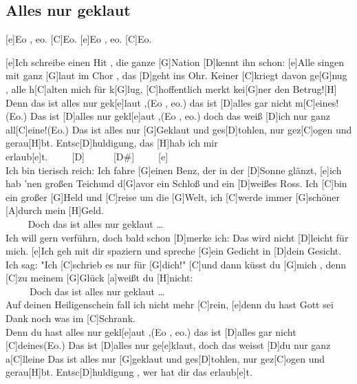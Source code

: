 \documentclass[10pt,a5paper,twoside, cleardoubleplain]{scrbook}
\begin{document}
\subsection{Alles nur geklaut}
\begin{guitar}

[e]Eo , eo. [C]Eo. [e]Eo , eo. [C]Eo.

[e]Ich schreibe einen Hit , die ganze [G]Nation [D]kennt ihn schon:
[e]Alle singen mit ganz [G]laut im Chor , das [D]geht ins Ohr.
Keiner [C]kriegt davon ge[G]nug , alle h[C]alten mich für k[G]lug,
[C]hoffentlich merkt kei[G]ner den Betrug![H]
\\
Denn das ist alles nur gek[e]laut ,(Eo , eo.) das ist [D]alles gar nicht m[C]eines!(Eo.)
Das ist [D]alles nur gekl[e]aut ,(Eo , eo.) doch das weiß [D]ich nur ganz all[C]eine!(Eo.)
Das ist alles nur [G]Geklaut und ges[D]tohlen, nur gez[C]ogen und gerau[H]bt.
Entsc[D]huldigung, das [H]hab ich mir erlaub[e]t.~~~~~[D]~~~~~~[D#]~~~~~[e]
\\
[e]Ich bin tierisch reich: Ich fahre [G]einen Benz, der in der [D]Sonne glänzt,
[e]ich hab 'nen großen Teichund d[G]avor ein Schloß und ein [D]weißes Ross. 
Ich [C]bin ein großer [G]Held und [C]reise um die [G]Welt, 
ich [C]werde immer [G]schöner [A]durch mein [H]Geld.
\\
~~~~ Doch das ist alles nur geklaut \ldots
\\
[e]Ich will gern verführn, doch bald schon [D]merke ich: Das wird nicht [D]leicht für mich. 
[e]Ich geh mit dir spaziern und spreche [G]ein Gedicht in [D]dein Gesicht. 
Ich sag: "Ich [C]schrieb es nur für [G]dich!" [C]und dann küsst du [G]mich , 
denn [C]zu meinem [G]Glück [a]weißt du [H]nicht:
\\
~~~~~Doch das ist alles nur geklaut \ldots
\\
[e]Auf deinen Heiligenschein fall ich nicht mehr [C]rein,
[e]denn du hast Gott sei Dank noch was im [C]Schrank.
\\
Denn du hast alles nur gekl[e]aut ,(Eo , eo.)  das ist [D]alles gar nicht [C]deines(Eo.)
Das ist [D]alles nur ge[e]klaut, doch das weisst [D]du nur ganz a[C]lleine
Das ist alles nur [G]geklaut und ges[D]tohlen, nur gez[C]ogen und gerau[H]bt.
Entsc[D]huldigung , wer hat dir das erlaub[e]t.
\end{guitar}

  	
\newpage  

  	
\end{document}
